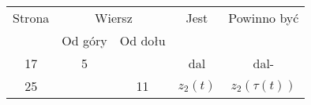\documentclass[a4paper,11pt]{article}
\begin{document}











\vspace{0em}



\vspace{0em}


\begin{center}

  \begin{tabular}{|c|c|c|c|c|}
    \hline
    Strona & \multicolumn{2}{c|}{Wiersz} & Jest
                              & Powinno być \\ \cline{2-3}
    & Od góry & Od dołu & & \\
    \hline
    17  &  5 & & dal & dal- \\
    25  & & 11 & $z_{ 2 }( t )$ & $z_{ 2 }( \tau( t ) )$ \\
    \hline
  \end{tabular}

\end{center}

\vspace{\spaceTwo}


















{}






\end{document}
